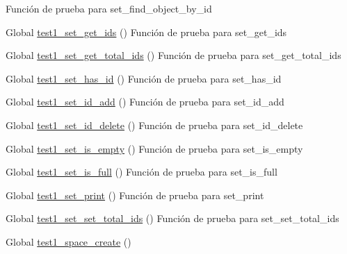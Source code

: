 \begin{DoxyRefList}
%
Función de prueba para set\+\_\+find\+\_\+object\+\_\+by\+\_\+id  
\item[Global \mbox{\hyperlink{set__test_8c_a5121f8a96087a7f941ffb785d3f826c9}{test1\+\_\+set\+\_\+get\+\_\+ids}} ()]\label{test__test000218}%
%
Función de prueba para set\+\_\+get\+\_\+ids  
\item[Global \mbox{\hyperlink{set__test_8c_a31f1c6b37046c1c8d8fc6175ce78f175}{test1\+\_\+set\+\_\+get\+\_\+total\+\_\+ids}} ()]\label{test__test000198}%
%
Función de prueba para set\+\_\+get\+\_\+total\+\_\+ids  
\item[Global \mbox{\hyperlink{set__test_8c_affa806cab8e900cc297cc1a58f5ac35c}{test1\+\_\+set\+\_\+has\+\_\+id}} ()]\label{test__test000200}%
%
Función de prueba para set\+\_\+has\+\_\+id  
\item[Global \mbox{\hyperlink{set__test_8c_a49426ad2bfe388add4ae96d3caa8ad82}{test1\+\_\+set\+\_\+id\+\_\+add}} ()]\label{test__test000187}%
%
Función de prueba para set\+\_\+id\+\_\+add  
\item[Global \mbox{\hyperlink{set__test_8c_a7b258a134d0d34bae43931357c187649}{test1\+\_\+set\+\_\+id\+\_\+delete}} ()]\label{test__test000191}%
%
Función de prueba para set\+\_\+id\+\_\+delete  
\item[Global \mbox{\hyperlink{set__test_8c_a0d1505a528700bc71c89a71c88d6b21e}{test1\+\_\+set\+\_\+is\+\_\+empty}} ()]\label{test__test000208}%
%
Función de prueba para set\+\_\+is\+\_\+empty  
\item[Global \mbox{\hyperlink{set__test_8c_a7bae6941906dd98c8d8ffb2da8a409f6}{test1\+\_\+set\+\_\+is\+\_\+full}} ()]\label{test__test000211}%
%
Función de prueba para set\+\_\+is\+\_\+full  
\item[Global \mbox{\hyperlink{set__test_8c_a3c854f4944f73793ff85c2490401b6e8}{test1\+\_\+set\+\_\+print}} ()]\label{test__test000215}%
%
Función de prueba para set\+\_\+print  
\item[Global \mbox{\hyperlink{set__test_8c_a4421e7919bd16efc335f14d678fb9560}{test1\+\_\+set\+\_\+set\+\_\+total\+\_\+ids}} ()]\label{test__test000195}%
%
Función de prueba para set\+\_\+set\+\_\+total\+\_\+ids  
\item[Global \mbox{\hyperlink{space__test_8c_a69278cc022dc5688d4725f8d36317b30}{test1\+\_\+space\+\_\+create}} ()]\label{test__test000220}%

\end{DoxyRefList}
